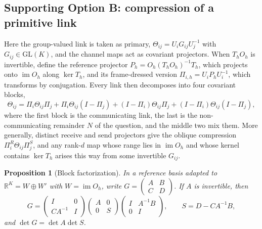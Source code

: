 \documentclass[11pt]{article}
\newtheorem{proposition}[theorem]{Proposition}
\theoremstyle{definition}
\theoremstyle{remark}
\providecommand{\GL}{\mathrm{GL}}
\providecommand{\im}{\operatorname{im}}
\providecommand{\C}{\mathbb{C}}
\begin{document}
\subsection{Supporting Option B: compression of a primitive link}
\label{links:origin:sec:compression}

Here the group-valued link is taken as primary, $\Theta_{ij}=U_iG_{ij}U_j^{-1}$ with $G_{ij}\in\GL(K)$, and the channel maps act as covariant projectors. When $T_hO_h$ is invertible, define the reference projector $P_h=O_h(T_hO_h)^{-1}T_h$, which projects onto $\im O_h$ along $\ker T_h$, and its frame-dressed version $\Pi_{i,h}=U_iP_hU_i^{-1}$, which transforms by conjugation. Every link then decomposes into four covariant blocks,
\begin{equation}
\Theta_{ij}=\Pi_{i}\Theta_{ij}\Pi_{j}+\Pi_{i}\Theta_{ij}(I-\Pi_{j})+(I-\Pi_{i})\Theta_{ij}\Pi_{j}+(I-\Pi_{i})\Theta_{ij}(I-\Pi_{j}),
\label{links:origin:eq:blocks}
\end{equation}
where the first block is the communicating link, the last is the non-communicating remainder $N$ of the question, and the middle two mix them. More generally, distinct receive and send projectors give the oblique compression $\Pi^R_i\Theta_{ij}\Pi^S_j$, and any rank-$d$ map whose range lies in $\im O_h$ and whose kernel contains $\ker T_h$ arises this way from some invertible $G_{ij}$.

\begin{proposition}[Block factorization]
\label{links:origin:prop:levi}
In a reference basis adapted to $\mathbb R^K=W\oplus W'$ with $W=\im O_h$, write $G=\begin{pmatrix}A&B\\C&D\end{pmatrix}$. If $A$ is invertible, then
\begin{equation}
G=\begin{pmatrix}I&0\\CA^{-1}&I\end{pmatrix}
\begin{pmatrix}A&0\\0&S\end{pmatrix}
\begin{pmatrix}I&A^{-1}B\\0&I\end{pmatrix},\qquad S=D-CA^{-1}B,
\label{links:origin:eq:levi}
\end{equation}
and $\det G=\det A\det S$.
\end{proposition}
\end{document}
